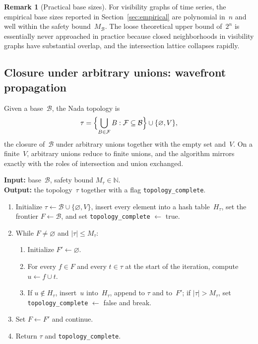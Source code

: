 \documentclass[11pt,a4paper]{article}
\theoremstyle{plain}
\theoremstyle{definition}
\newtheorem{remark}[theorem]{Remark}
\newcommand{\base}{\mathcal{B}}
\begin{document}
\begin{remark}[Practical base sizes]\label{rem:practical-base-size}
For visibility graphs of time series, the empirical base sizes reported in
Section~\ref{sec:empirical} are polynomial in~$n$ and well within the
safety bound~$M_{\base}$.  The loose theoretical upper bound of~$2^n$ is
essentially never approached in practice because closed neighborhoods in
visibility graphs have substantial overlap, and the intersection lattice
collapses rapidly.
\end{remark}


\subsection{Closure under arbitrary unions: wavefront propagation}%
\label{subsec:union-closure}

Given a base~$\base$, the Nada topology is
\[
  \tau = \Bigl\{\bigcup_{B \in \mathcal{F}} B : \mathcal{F} \subseteq \base
  \Bigr\} \cup \{\varnothing, V\},
\]
the closure of~$\base$ under arbitrary unions together with the empty set
and~$V$.  On a finite~$V$, arbitrary unions reduce to finite unions, and the
algorithm mirrors  exactly with the roles of
intersection and union exchanged.

\begin{algorithm}
\caption{Union closure by wavefront propagation}%
\label{alg:union-closure}
\textbf{Input:} base~$\base$, safety bound $M_{\tau} \in \mathbb{N}$. \\
\textbf{Output:} the topology~$\tau$ together with a flag
\texttt{topology\_complete}.
\begin{enumerate}[leftmargin=2em, label=\textup{(\arabic*)}]
  \item Initialize $\tau \leftarrow \base \cup \{\varnothing, V\}$, insert
        every element into a hash table~$H_{\tau}$, set the frontier
        $F \leftarrow \base$, and set \texttt{topology\_complete}
        $\leftarrow$ \textup{true}.
  \item While $F \neq \varnothing$ and $|\tau| \leq M_{\tau}$:
  \begin{enumerate}[leftmargin=1.5em, label=\textup{(\alph*)}]
    \item Initialize $F' \leftarrow \varnothing$.
    \item For every $f \in F$ and every $t \in \tau$ at the start of the
          iteration, compute $u \leftarrow f \cup t$.
    \item If $u \notin H_{\tau}$, insert~$u$ into~$H_{\tau}$, append to
          $\tau$ and to~$F'$; if $|\tau| > M_{\tau}$, set
          \texttt{topology\_complete} $\leftarrow$ \textup{false} and break.
  \end{enumerate}
  \item Set $F \leftarrow F'$ and continue.
  \item Return $\tau$ and \texttt{topology\_complete}.
\end{enumerate}
\end{algorithm}
\end{document}
